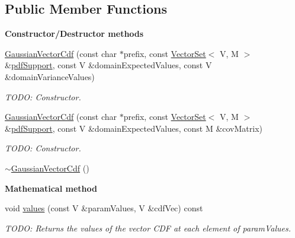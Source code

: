\subsection*{Public Member Functions}
\begin{Indent}{\bf Constructor/\-Destructor methods}\par
\begin{DoxyCompactItemize}
\item 
\hyperlink{class_q_u_e_s_o_1_1_gaussian_vector_cdf_aeb3e7d0cc777d58fb93d046a9da12071}{Gaussian\-Vector\-Cdf} (const char $\ast$prefix, const \hyperlink{class_q_u_e_s_o_1_1_vector_set}{Vector\-Set}$<$ V, M $>$ \&\hyperlink{class_q_u_e_s_o_1_1_base_vector_cdf_aaf5088d3994606a9d449ccd414509709}{pdf\-Support}, const V \&domain\-Expected\-Values, const V \&domain\-Variance\-Values)
\begin{DoxyCompactList}\small\item\em T\-O\-D\-O\-: Constructor. \end{DoxyCompactList}\item 
\hyperlink{class_q_u_e_s_o_1_1_gaussian_vector_cdf_a2f0d23a52c90f82877363de1155b788f}{Gaussian\-Vector\-Cdf} (const char $\ast$prefix, const \hyperlink{class_q_u_e_s_o_1_1_vector_set}{Vector\-Set}$<$ V, M $>$ \&\hyperlink{class_q_u_e_s_o_1_1_base_vector_cdf_aaf5088d3994606a9d449ccd414509709}{pdf\-Support}, const V \&domain\-Expected\-Values, const M \&cov\-Matrix)
\begin{DoxyCompactList}\small\item\em T\-O\-D\-O\-: Constructor. \end{DoxyCompactList}\item 
\hyperlink{class_q_u_e_s_o_1_1_gaussian_vector_cdf_a086e92beba8cffc2d0c4822aad49dfac}{$\sim$\-Gaussian\-Vector\-Cdf} ()
\end{DoxyCompactItemize}
\end{Indent}
\begin{Indent}{\bf Mathematical method}\par
\begin{DoxyCompactItemize}
\item 
void \hyperlink{class_q_u_e_s_o_1_1_gaussian_vector_cdf_a369ca9e3dea35ddb4799a89db47b12d6}{values} (const V \&param\-Values, V \&cdf\-Vec) const 
\begin{DoxyCompactList}\small\item\em T\-O\-D\-O\-: Returns the values of the vector C\-D\-F at each element of {\ttfamily param\-Values}. \end{DoxyCompactList}\end{DoxyCompactItemize}
\end{Indent}
